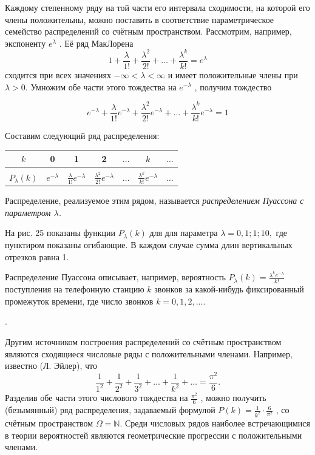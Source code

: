 \begin{zam}
Каждому степенному ряду на той части его интервала
сходимости, на которой его члены положительны, можно поставить в соответствие параметрическое семейство распределений со счётным пространством.
Рассмотрим, например, экспоненту $e^\lambda$ . Её ряд МакЛорена
$$1+ \frac{\lambda}{1!} + \frac{\lambda^2}{2!} + \ldots + \frac{\lambda^k}{k!} = e^\lambda$$
сходится при всех значениях $−\infty < \lambda < \infty$ и имеет положительные члены при $\lambda > 0$. Умножим обе части этого тождества на $e^{−\lambda}$ , получим тождество

$$e^{−\lambda}+ \frac{\lambda}{1!} e^{−\lambda} + \frac{\lambda^2}{2!} e^{−\lambda}+ \ldots + \frac{\lambda^k}{k!} e^{−\lambda}= 1$$

Составим следующий ряд распределения:

\begin{center}
	\begin{tabular}{|c|c|c|c|c|c|c|}
		\hline
		$k$ 			& 0 								& 1 				  & 2 & $\ldots$ & $k$ 		& $\ldots$ \\ \hline
		&&&&&& \\[-1em] 
		$P_\lambda(k)$  & $e^{-\lambda}$ & $\frac{\lambda}{1!}e^{-\lambda}$ & $\frac{\lambda^2}{2!}e^{-\lambda}$ & $\ldots$ & $\frac{\lambda^k}{k!}e^{-\lambda}$& $\ldots$ \\[1ex] \hline
	\end{tabular}
\end{center}
\end{zam}

\begin{definition}
Распределение, реализуемое этим рядом, называется \textit{распределением Пуассона с параметром $\lambda$.}

На рис. 25 показаны функции $P_\lambda (k)$ для для параметра $\lambda = 0, 1; 1; 10,$ где
пунктиром показаны огибающие. В каждом случае сумма длин вертикальных отрезков равна 1.

Распределение Пуассона описывает, например, вероятность $P_\lambda (k) = \frac{\lambda^k e^{-\lambda}}{k!}$
поступления на телефонную станцию $k$ звонков за какой-нибудь фиксированный промежуток времени, где число звонков $k = 0, 1, 2, \ldots$.
\end{definition}. 
\begin{zam}
Другим источником построения распределений со счётным пространством являются сходящиеся числовые ряды с положительными членами. Например, известно (Л. Эйлер), что
$$\frac{1}{1^2} + \frac{1}{2^2} + \frac{1}{3^2} + \ldots + \frac{1}{k^2} + \ldots = \frac{\pi^2}{6}.$$
Разделив обе части этого числового тождества на $\frac{\pi^2}{6}$ , можно получить (безымянный) ряд распределения, задаваемый формулой $P(k) = \frac{1}{k^2} \cdot \frac{6}{\pi^2}$ , со счётным пространством $\Omega = \mathbb{N}$.
Среди числовых рядов наиболее встречающимися в теории вероятностей являются геометрические прогрессии с положительными членами.
\end{zam}

